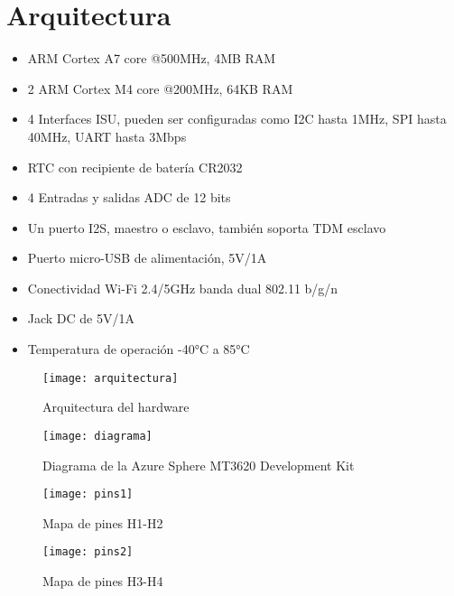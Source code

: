 \section{Arquitectura}
\begin{itemize}
	\item
	ARM Cortex A7 core @500MHz, 4MB RAM
	\item
	2 ARM Cortex M4 core @200MHz, 64KB RAM
	\item
	4 Interfaces ISU, pueden ser configuradas como I2C hasta 1MHz, SPI hasta 40MHz, UART hasta 3Mbps
	\item
	RTC con recipiente de batería CR2032
	\item
	4 Entradas y salidas ADC de 12 bits
	\item
	Un puerto I2S, maestro o esclavo, también soporta TDM esclavo
	\item
	Puerto micro-USB de alimentación, 5V/1A
	\item
	Conectividad Wi-Fi 2.4/5GHz banda dual 802.11 b/g/n
	\item
	Jack DC de 5V/1A
	\item
	Temperatura de operación -40°C a 85°C
\end{itemize}	
\begin{figure}[h]
	\centering
	\texttt{[image: arquitectura]}
	\caption{Arquitectura del hardware}
\end{figure}

\begin{figure}[h]
	\centering
	\texttt{[image: diagrama]}
	\caption{Diagrama de la Azure Sphere MT3620 Development Kit}
\end{figure}

\begin{figure}[h]
	\centering
	\texttt{[image: pins1]}
	\caption{Mapa de pines H1-H2}
\end{figure}

\begin{figure}[h]
	\centering
	\texttt{[image: pins2]}
	\caption{Mapa de pines H3-H4}
\end{figure}